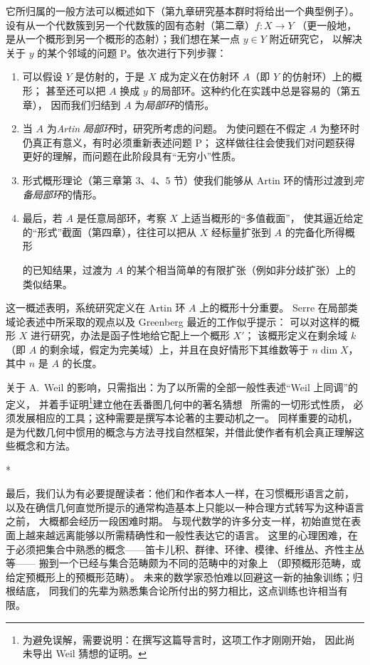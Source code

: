 \documentclass[UTF8,fontset=none,11pt,oneside,openany]{ctexbook}
\newcommand{\oldpage}[2][]{%
  \hypertarget{ega-source-page-#1-#2}{}%
  \marginnote{\scriptsize\textbf{#1}~|~#2}\ignorespaces}
\begin{document}
它所归属的一般方法可以概述如下（第九章研究基本群时将给出一个典型例子）。
设有从一个代数簇到另一个代数簇的固有态射（第二章）$f:X\to Y$
（更一般地，是从一个概形到另一个概形的态射）；我们想在某一点 $y\in Y$ 附近研究它，
以解决关于 $y$ 的某个邻域的问题 P。依次进行下列步骤：
\begin{enumerate}
  \item[$1^\circ$] 可以假设 $Y$ 是仿射的，于是 $X$ 成为定义在仿射环 $A$（即 $Y$ 的仿射环）上的概形；
  甚至还可以把 $A$ 换成 $y$ 的局部环。这种约化在实践中总是容易的（第五章），
  因而我们归结到 $A$ 为\emph{局部环}的情形。
  \item[$2^\circ$] 当 $A$ 为\emph{Artin 局部环}时，研究所考虑的问题。
  为使问题在不假定 $A$ 为整环时仍真正有意义，有时必须重新表述问题 P；
  这样做往往会使我们对问题获得更好的理解，而问题在此阶段具有“无穷小”性质。
  \item[$3^\circ$] 形式概形理论（第三章第 3、4、5 节）使我们能够从 Artin 环的情形过渡到\emph{完备局部环}的情形。
  \item[$4^\circ$] 最后，若 $A$ 是任意局部环，考察 $X$ 上适当概形的“多值截面”，
  使其逼近给定的“形式”截面（第四章），往往可以把从 $X$ 经标量扩张到 $A$ 的完备化所得概形

  \oldpage[I]{9}
  的已知结果，过渡为 $A$ 的某个相当简单的有限扩张（例如非分歧扩张）上的类似结果。
\end{enumerate}

这一概述表明，系统研究定义在 Artin 环 $A$ 上的概形十分重要。
Serre 在局部类域论表述中所采取的观点以及 Greenberg 最近的工作似乎提示：
可以对这样的概形 $X$ 进行研究，办法是函子性地给它配上一个概形 $X'$；
该概形定义在剩余域 $k$（即 $A$ 的剩余域，假定为完美域）上，并且在良好情形下其维数等于 $n\dim X$，
其中 $n$ 是 $A$ 的长度。

关于 A.~Weil 的影响，只需指出：为了以所需的全部一般性表述“Weil 上同调”的定义，
并着手证明\footnote{为避免误解，需要说明：在撰写这篇导言时，这项工作才刚刚开始，
因此尚未导出 Weil 猜想的证明。}建立他在丢番图几何中的著名猜想~\cite{I-19} 所需的一切形式性质，
必须发展相应的工具；这种需要是撰写本论著的主要动机之一。
同样重要的动机，是为代数几何中惯用的概念与方法寻找自然框架，并借此使作者有机会真正理解这些概念和方法。

\bigskip
\begin{center}*\quad*\quad* \end{center}
\bigskip

最后，我们认为有必要提醒读者：他们和作者本人一样，在习惯概形语言之前，
以及在确信几何直觉所提示的通常构造基本上只能以一种合理方式转写为这种语言之前，
大概都会经历一段困难时期。
与现代数学的许多分支一样，初始直觉在表面上越来越远离能够以所需精确性和一般性表达它的语言。
这里的心理困难，在于必须把集合中熟悉的概念——笛卡儿积、群律、环律、模律、纤维丛、齐性主丛等——
搬到一个已经与集合范畴颇为不同的范畴中的对象上
（即预概形范畴，或给定预概形上的预概形范畴）。
未来的数学家恐怕难以回避这一新的抽象训练；归根结底，
同我们的先辈为熟悉集合论所付出的努力相比，这点训练也许相当有限。
\end{document}
